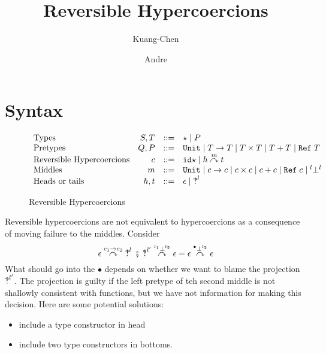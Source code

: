 \documentclass[]{article}
\title{Reversible Hypercoercions}
\author{
	Kuang-Chen \and	Andre
}
\newcommand{\stxrule}[3]{\text{#2} & #1 & ::= & #3\\}
\newcommand{\stxrulecont}[1]{& & | & #1 \\}
\newcommand{\TDyn}{\star}
\newcommand{\PUnit}{\mathtt{Unit}}
\newcommand{\PFunction}[2]{#1 \rightarrow #2}
\newcommand{\PProduct}[2]{#1 \times #2}
\newcommand{\PSum}[2]{#1 + #2}
\newcommand{\PRef}[1]{\mathtt{Ref}\;#1}
\newcommand{\tvar}[1]{#1}
\newcommand{\tunit}[0]{\mathtt{unit}}
\newcommand{\tlambda}[4]{\lambda^{\PFunction{#1}{#2}}#3.#4}
\newcommand{\tapp}[2]{(#1 \; #2)}
\newcommand{\tcons}[4]{\mathtt{cons}^{\PProduct{#1}{#2}} \; #3 \; #4}
\newcommand{\tfst}[1]{\mathtt{fst} \; #1}
\newcommand{\tsnd}[1]{\mathtt{snd} \; #1}
\newcommand{\tinl}[3]{\mathtt{inl}^{\PSum{#1}{#2}} \; #3}
\newcommand{\tcase}[3]{\mathtt{case} \; #1 \; #2 \; #3}
\newcommand{\tcast}[4]{#1 \langle #2\Rightarrow^{#3}#4 \rangle}
\newcommand{\tblame}[1]{\mathtt{blame} \; #1}
\newcommand{\tread}[1]{\mathtt{!}\;#1}
\newcommand{\twrite}[2]{#1\;\mathtt{:=}\;#2}
\newcommand{\hcheck}[1]{\text{\textinterrobang}^{#1}}
\newcommand{\hid}[0]{\epsilon}
\newcommand{\mUnit}{\mathtt{Unit}}
\newcommand{\mFunction}[2]{#1 \rightarrow #2}
\newcommand{\mProduct}[2]{#1 \times #2}
\newcommand{\mSum}[2]{#1 + #2}
\newcommand{\mRef}[1]{\mathtt{Ref}\;#1}
\newcommand{\mBot}[2]{{^{#1}}\bot^{#2}}
\newcommand{\ciddyn}{\mathtt{id\star}}
\newcommand{\chmt}[3]{#1 \overset{#2}{\curvearrowright} #3}
\begin{document}
\maketitle

%

\section{Syntax}

\begin{figure}
	\[
	\begin{array}{lrcl}
	\stxrule{S,T}{Types}{
		\TDyn \mid P
	}
	\stxrule{Q,P}{Pretypes}{
		\PUnit \mid
		\PFunction{T}{T} \mid
		\PProduct{T}{T} \mid
		\PSum{T}{T} \mid
		\PRef{T}
	}
\stxrule{c}{Reversible Hypercoercions}{
	\ciddyn \mid
	\chmt{h}{m}{t}
}
\stxrule{m}{Middles}{
\mUnit \mid
\mFunction{c}{c} \mid
\mProduct{c}{c} \mid
\mSum{c}{c} \mid
\mRef{c} \mid
\mBot{l}{l}
}
\stxrule{h,t}{Heads or tails}{
\hid \mid \hcheck{l}
}
	\end{array}
	\]
	
\caption{Reversible Hypercoercions}
\end{figure}

Reversible hypercoercions are not equivalent to hypercoercions as a consequence 
of moving failure to the middles. Consider 
\[
\chmt{\hid}{\mFunction{c_1}{c_2}}{\hcheck{l}}
\;\fatsemi\;
\chmt{\hcheck{l'}}{\mBot{l_1}{l_2}}{\hid}
=
\chmt{\hid}{\mBot{\bullet}{l_2}}{\hid}
\]
What should go into the $\bullet$ depends on whether we want to blame the 
projection $\hcheck{l'}$. The projection is guilty if the left pretype of teh 
second middle is not shallowly consistent with functions, but we have not 
information for making this decision. Here are some potential solutions:
\begin{itemize}
	\item include a type constructor in head
	\item include two type constructors in bottoms.
\end{itemize}
\end{document}
